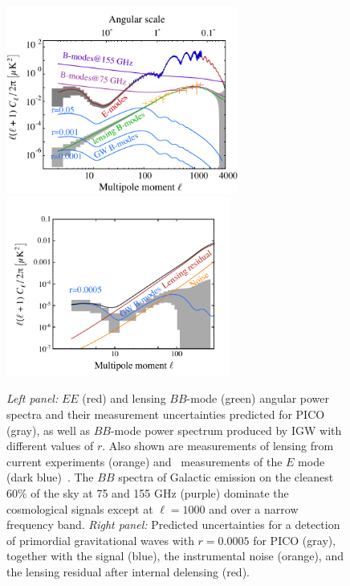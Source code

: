 \documentclass[PICOReport.tex]{subfiles}
\begin{document}
\begin{figure}[!htb]
\centering
\hspace{-0.15in}
\includegraphics[width=3in]{images/cmb_powspec_PICOv4p1_v2.pdf}
\hspace{-0.15in}
\includegraphics[width=2.9in,trim= 0cm 0.2cm 0cm 0cm]{images/cmbbb_powspec_PICOv4p1.pdf}
\caption{{\em Left panel:} $EE$ (red) and lensing $BB$-mode (green) angular power spectra and their measurement uncertainties predicted for PICO (gray), as well as $BB$-mode power spectrum produced by \ac{IGW} with different values of $r$. Also shown are measurements of lensing from current experiments (orange) and \planck~measurements of the $E$ mode (dark blue)~\citep{polar+,planck?}. The $BB$ spectra of Galactic emission on the cleanest $60\%$ of the sky at 75 and 155 GHz (purple) dominate the cosmological signals except at $\ell=1000$ and over a narrow frequency band. 
{\em Right panel:} Predicted uncertainties for a detection of primordial gravitational waves with $r=0.0005$ for PICO (gray), together with the signal (blue), the instrumental noise (orange), and the lensing residual after internal delensing (red).}
\label{fig:clbb}
\end{figure}
\end{document}

